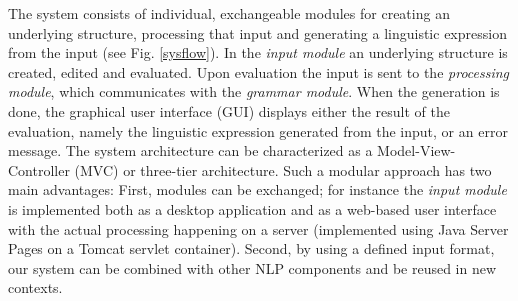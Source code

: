 \documentclass[a4paper, halfparskip, onecolumn, abstracton, final, figurecaptionabove]{scrartcl}
\begin{document}


The system consists of individual, exchangeable modules for creating an underlying structure, processing that input and generating a linguistic expression from the input (see Fig. \ref{sysflow}). In the \emph{input module} an underlying structure is created, edited and evaluated. Upon evaluation the input is sent to the \emph{processing module}, which communicates with the \emph{grammar module}. When the generation is done, the graphical user interface (GUI) displays either the result of the evaluation, namely the linguistic expression generated from the input, or an error message. The system architecture can be characterized as a Model-View-Controller (MVC) or three-tier architecture. Such a modular approach has two main advantages: First, modules can be exchanged; for instance the \emph{input module} is implemented both as a desktop application and as a web-based user interface with the actual processing happening on a server (implemented using Java Server Pages on a Tomcat servlet container). Second, by using a defined input format, our system can be combined with other NLP components and be reused in new contexts.
\end{document}
